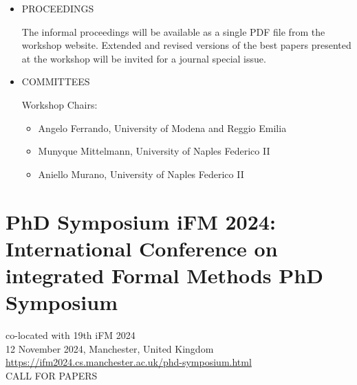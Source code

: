 \documentclass[prodmode,acmtecs]{acmsmall} %
\begin{document}
\begin{itemize}
\item  PROCEEDINGS  
 
  The informal proceedings will be available as a single PDF file from the workshop website. Extended and revised versions of the best papers presented at the workshop will be invited for a journal special issue. 
 
\item  COMMITTEES 
 
  Workshop Chairs:  
 
\begin{itemize}\item  Angelo Ferrando, University of Modena and Reggio Emilia
\item  Munyque Mittelmann, University of Naples Federico II
\item  Aniello Murano, University of Naples Federico II
\end{itemize} 
\end{itemize}\section{PhD Symposium iFM 2024: International Conference on integrated Formal Methods PhD Symposium}\label{PhDSymposiumiFM2024}  co-located with 19th iFM 2024\\ 
  12 November 2024, Manchester, United Kingdom\\ 
  \href{https://ifm2024.cs.manchester.ac.uk/phd-symposium.html}{https://ifm2024.cs.manchester.ac.uk/phd-symposium.html}\\ 
CALL FOR PAPERS 
\end{document}

